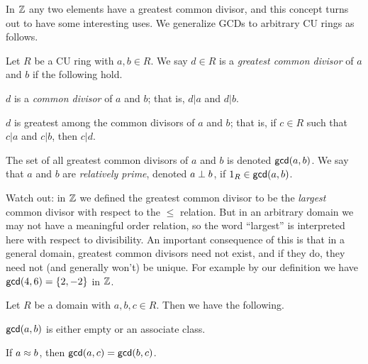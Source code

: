 In \(\mathbb{Z}\) any two elements have a greatest common divisor, and this concept turns out to have some interesting uses.
We generalize GCDs to arbitrary CU rings as follows.

\begin{dfn}
Let \(R\) be a CU ring with \(a,b \in R\).
We say \(d \in R\) is a \emph{greatest common divisor} of \(a\) and \(b\) if the following hold.
\begin{proplist}
\item \(d\) is a \emph{common divisor} of \(a\) and \(b\); that is, \(d|a\) and \(d|b\).
\item \(d\) is greatest among the common divisors of \(a\) and \(b\); that is, if \(c \in R\) such that \(c|a\) and \(c|b\), then \(c|d\).
\end{proplist}
The set of all greatest common divisors of \(a\) and \(b\) is denoted \(\mathsf{gcd}(a, b)\).
We say that \(a\) and \(b\) are \emph{relatively prime}, denoted \(a \perp b\), if \(1_R \in \mathsf{gcd}(a, b)\).
\end{dfn}

Watch out: in \(\mathbb{Z}\) we defined the greatest common divisor to be the \emph{largest} common divisor with respect to the \(\leq\) relation.
But in an arbitrary domain we may not have a meaningful order relation, so the word ``largest'' is interpreted here with respect to divisibility.
An important consequence of this is that in a general domain, greatest common divisors need not exist, and if they do, they need not (and generally won't) be unique.
For example by our definition we have \(\mathsf{gcd}(4, 6) = \{2, -2\}\) in \(\mathbb{Z}\).

\begin{prop} \label{prop:gcd-assoc}
Let \(R\) be a domain with \(a,b,c \in R\).
Then we have the following.
\begin{proplist*}
\item \label{prop:gcd-assoc:class}\(\mathsf{gcd}(a, b)\) is either empty or an associate class.
\item \label{prop:gcd-assoc:well-defined} If \(a \approx b\), then \(\mathsf{gcd}(a, c) = \mathsf{gcd}(b, c)\).
\end{proplist*}
\end{prop}

